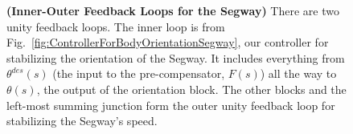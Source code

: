 \begin{figure}[htb]
    \caption{\textbf{(Inner-Outer Feedback Loops for the Segway)} There are two unity feedback loops. The inner loop is from Fig.~\ref{fig:ControllerForBodyOrientationSegway}, our controller for stabilizing the orientation of the Segway. It includes everything from $\theta^{des}(s)$ (the input to the pre-compensator, $F(s)$) all the way to $\theta(s)$, the output of the orientation block. The other blocks and the left-most summing junction form the outer unity feedback loop for stabilizing the Segway's speed.}
    \label{fig:InnerOuterFeedbackLoop4Segway}
\end{figure} 

\bigskip
\bigskip

